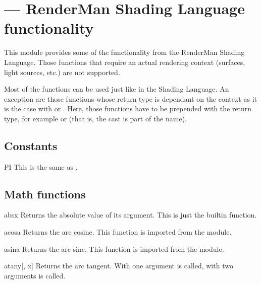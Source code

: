 \section{ ---
         RenderMan Shading Language functionality}


This module provides some of the functionality from the RenderMan
Shading Language. Those functions that require an actual rendering
context (surfaces, light sources, etc.) are not supported.

Most of the functions can be used just like in the Shading
Language. An exception are those functions whose return type is
dependant on the context as it is the case with  or
. Here, those functions have to be prepended with the 
return type, for example  or 
 (that is, the cast is part of the name).

\subsection{Constants}

\begin{datadesc}{PI}
This is the same as .
\end{datadesc}

\subsection{Math functions}

\begin{funcdesc}{abs}{x}
Returns the absolute value of its argument. This is just the builtin
 function.
\end{funcdesc}

\begin{funcdesc}{acos}{a}
Returns the arc cosine. This function is imported from the
 module.
\end{funcdesc}

\begin{funcdesc}{asin}{a}
Returns the arc sine. This function is imported from the  module.
\end{funcdesc}

\begin{funcdesc}{atan}{y[, x]}
Returns the arc tangent. With one argument  is
called, with two arguments  is called.
\end{funcdesc}

